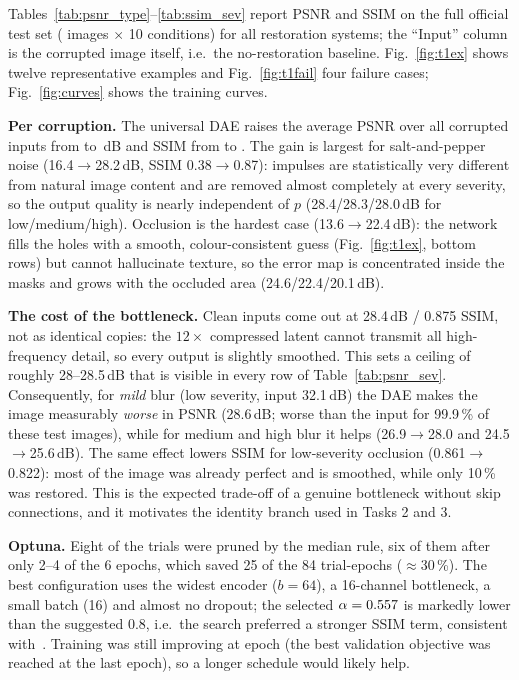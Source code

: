 Tables~\ref{tab:psnr_type}--\ref{tab:ssim_sev} report PSNR and SSIM on the full official test set (\NTEST{} images $\times$ 10 conditions) for all restoration systems; the ``Input'' column is the corrupted image itself, i.e.\ the no-restoration baseline. Fig.~\ref{fig:t1ex} shows twelve representative examples and Fig.~\ref{fig:t1fail} four failure cases; Fig.~\ref{fig:curves} shows the training curves.



\textbf{Per corruption.} The universal DAE raises the average PSNR over all corrupted inputs from \INPUTPSNRCORR{} to \TONEPSNRCORR\,dB and SSIM from \INPUTSSIMCORR{} to \TONESSIMCORR. The gain is largest for salt-and-pepper noise (16.4$\to$28.2\,dB, SSIM 0.38$\to$0.87): impulses are statistically very different from natural image content and are removed almost completely at every severity, so the output quality is nearly independent of $p$ (28.4/28.3/28.0\,dB for low/medium/high). Occlusion is the hardest case (13.6$\to$22.4\,dB): the network fills the holes with a smooth, colour-consistent guess (Fig.~\ref{fig:t1ex}, bottom rows) but cannot hallucinate texture, so the error map is concentrated inside the masks and grows with the occluded area (24.6/22.4/20.1\,dB).

\textbf{The cost of the bottleneck.} Clean inputs come out at 28.4\,dB / 0.875 SSIM, not as identical copies: the $12\times$ compressed latent cannot transmit all high-frequency detail, so every output is slightly smoothed. This sets a ceiling of roughly 28--28.5\,dB that is visible in every row of Table~\ref{tab:psnr_sev}. Consequently, for \emph{mild} blur (low severity, input 32.1\,dB) the DAE makes the image measurably \emph{worse} in PSNR (28.6\,dB; worse than the input for 99.9\,\% of these test images), while for medium and high blur it helps (26.9$\to$28.0 and 24.5$\to$25.6\,dB). The same effect lowers SSIM for low-severity occlusion (0.861$\to$0.822): most of the image was already perfect and is smoothed, while only 10\,\% was restored. This is the expected trade-off of a genuine bottleneck without skip connections, and it motivates the identity branch used in Tasks 2 and 3.

\textbf{Optuna.} Eight of the \TONETRIALS{} trials were pruned by the median rule, six of them after only 2--4 of the 6 epochs, which saved 25 of the 84 trial-epochs ($\approx$30\,\%). The best configuration uses the widest encoder ($b=64$), a 16-channel bottleneck, a small batch (16) and almost no dropout; the selected $\alpha=0.557$ is markedly lower than the suggested 0.8, i.e.\ the search preferred a stronger SSIM term, consistent with~\cite{zhao2017loss}. Training was still improving at epoch \TONEEPOCHS{} (the best validation objective was reached at the last epoch), so a longer schedule would likely help.


